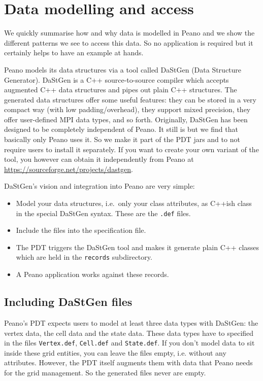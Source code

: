 \section{Data modelling and access}


\chapterDescription
  {
  } { 
    We quickly summarise how and why data is modelled in Peano and we show the 
    different patterns we see to access this data. So no application is required 
    but it certainly helps to have an example at hands.
  }
  
\noindent
Peano models its data structures via a tool called DaStGen (Data Structure
Generator).
DaStGen is a C++ source-to-source compiler which accepts augmented C++ data
structures and pipes out plain C++ structures.
The generated data structures offer some useful features: they can be stored in
a very compact way (with low padding/overhead), they support mixed precision,
they offer user-defined MPI data types, and so forth.
Originally, DaStGen has been designed to be completely independent of Peano. 
It still is but we find that basically only Peano uses it.
So we make it part of the PDT jars and to not require users to install it
separately.
If you want to create your own variant of the tool, you however can obtain it
independently from Peano at \url{https://sourceforge.net/projects/dastgen}.


DaStGen's vision and integration into Peano are very simple:
\begin{itemize}
  \item Model your data structures, i.e.~only your class attributes, as
  C++ish class in the special DaStGen syntax. These are the \texttt{.def} files.
  \item Include the files into the specification file.
  \item The PDT triggers the DaStGen tool and makes it generate plain C++
  classes which are held in the \texttt{records} subdirectory.
  \item A Peano application works against these records.
\end{itemize} 


\subsection{Including DaStGen files}

Peano's PDT expects users to model at least three data types with DaStGen: the
vertex data, the cell data and the state data.
These data types have to specified in the files \texttt{Vertex.def},
\texttt{Cell.def} and \texttt{State.def}.
If you don't model data to sit inside these grid entities, you can leave the
files empty, i.e. without any attributes.
However, the PDT itself augments them with data that Peano needs for the grid
management.
So the generated files never are empty.



